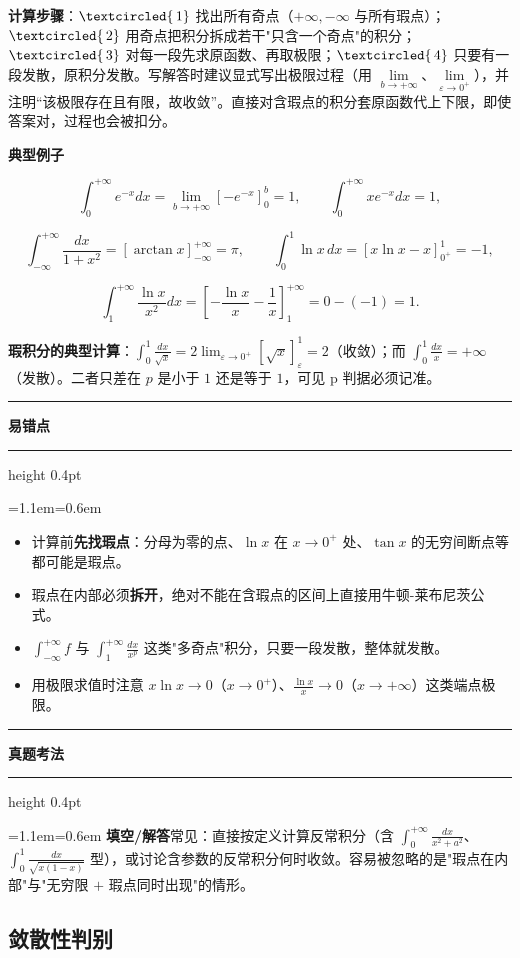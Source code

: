 \documentclass[11pt,openany,UTF8]{ctexbook}
\newcommand{\circled}[1]{\textcircled{\scriptsize\,#1}}
\newcommand{\callouthead}[2]{%
  \par\addvspace{7pt}\noindent
  {\color{#1}\rule[-0.15em]{3pt}{1.05em}}\hspace{0.5em}%
  {\bfseries\color{#1}#2}\par\nobreak\vspace{-0.35em}%
  {\color{rulesep}\hrule height 0.4pt}\nobreak\vspace{0.45em}%
  \begingroup\small\setlength{\parindent}{0pt}%
  \leftskip=1.1em\rightskip=0.6em\noindent\ignorespaces}
\newcommand{\calloutend}{\par\endgroup\addvspace{7pt}}
\newenvironment{callwarn}[1]{\callouthead{warnbar}{#1}}{\calloutend}
\newenvironment{callexam}[1]{\callouthead{exambar}{#1}}{\calloutend}
\begin{document}
\textbf{计算步骤}：$\circled{1}$ 找出所有奇点（$+\infty,-\infty$ 与所有瑕点）；$\circled{2}$ 用奇点把积分拆成若干"只含一个奇点"的积分；$\circled{3}$ 对每一段先求原函数、再取极限；$\circled{4}$ 只要有一段发散，原积分发散。写解答时建议显式写出极限过程（用 $\lim\limits_{b\to+\infty}$、$\lim\limits_{\varepsilon\to0^+}$），并注明“该极限存在且有限，故收敛”。直接对含瑕点的积分套原函数代上下限，即使答案对，过程也会被扣分。

\textbf{典型例子}

\[\int_0^{+\infty}e^{-x}dx=\lim_{b\to+\infty}\left[-e^{-x}\right]_0^b=1,\qquad \int_0^{+\infty}xe^{-x}dx=1,\]

\[\int_{-\infty}^{+\infty}\frac{dx}{1+x^2}=\left[\arctan x\right]_{-\infty}^{+\infty}=\pi,\qquad \int_0^1\ln x\,dx=\left[x\ln x-x\right]_{0^+}^{1}=-1,\]

\[\int_1^{+\infty}\frac{\ln x}{x^2}dx=\left[-\frac{\ln x}{x}-\frac{1}{x}\right]_1^{+\infty}=0-(-1)=1.\]

\textbf{瑕积分的典型计算}：$\displaystyle\int_0^1\frac{dx}{\sqrt{x}}=2\lim_{\varepsilon\to0^+}\left[\sqrt{x}\right]_\varepsilon^1=2$（收敛）；而 $\displaystyle\int_0^1\frac{dx}{x}=+\infty$（发散）。二者只差在 $p$ 是小于 $1$ 还是等于 $1$，可见 p 判据必须记准。

\begin{callwarn}{易错点}
\begin{itemize}
\item 计算前\textbf{先找瑕点}：分母为零的点、$\ln x$ 在 $x\to0^+$ 处、$\tan x$ 的无穷间断点等都可能是瑕点。
\item 瑕点在内部必须\textbf{拆开}，绝对不能在含瑕点的区间上直接用牛顿-莱布尼茨公式。
\item $\int_{-\infty}^{+\infty}f$ 与 $\int_1^{+\infty}\frac{dx}{x^p}$ 这类"多奇点"积分，只要一段发散，整体就发散。
\item 用极限求值时注意 $x\ln x\to0$（$x\to0^+$）、$\frac{\ln x}{x}\to0$（$x\to+\infty$）这类端点极限。
\end{itemize}
\end{callwarn}

\begin{callexam}{真题考法}
\textbf{填空/解答}常见：直接按定义计算反常积分（含 $\int_0^{+\infty}\frac{dx}{x^2+a^2}$、$\int_0^1\frac{dx}{\sqrt{x(1-x)}}$ 型），或讨论含参数的反常积分何时收敛。容易被忽略的是"瑕点在内部"与"无穷限 $+$ 瑕点同时出现"的情形。

\end{callexam}

\subsection{敛散性判别}
\end{document}
